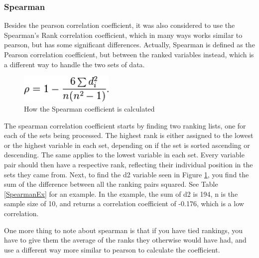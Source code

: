 \subsubsection{Spearman}

Besides the pearson correlation coefficient, it was also considered to use the Spearman’s Rank correlation coefficient, which in many ways works similar to pearson, but has some significant differences. Actually, Spearman is defined as the Pearson correlation coefficient, but between the ranked variables instead, which is a different way to handle the two sets of data.

\begin{figure}[htb]
\centering
\includegraphics[width=0.4\textwidth]{Images/SpearmanCalc.png}
\caption{How the Spearman coefficient is calculated}
\label{SpearCalc}
\end{figure}

The spearman correlation coefficient starts by finding two ranking lists, one for each of the sets being processed. The highest rank is either assigned to the lowest or the highest variable in each set, depending on if the set is sorted ascending or descending. The same applies to the lowest variable in each set. Every variable pair should then have a respective rank, reflecting their individual position in the sets they came from. Next, to find the d2 variable seen in Figure \ref{SpearCalc}, you find the sum of the difference between all the ranking pairs squared. See Table \ref{SpearmanEx} for an example. In the example, the sum of d2 is 194, n is the sample size of 10, and returns a correlation coefficient of -0.176, which is a low correlation.

One more thing to note about spearman is that if you have tied rankings, you have to give them the average of the ranks they otherwise would have had, and use a different way more similar to pearson to calculate the coefficient. \cite{Spearman1}

